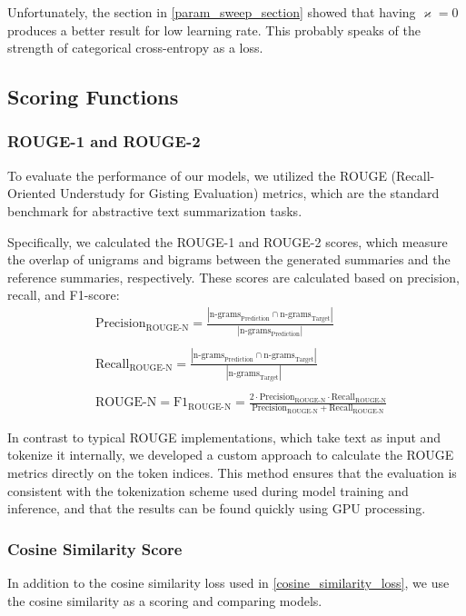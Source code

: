 Unfortunately, the section in \cref{param_sweep_section} showed that having $\varkappa = 0$ produces a better result for low learning rate.
This probably speaks of the strength of categorical cross-entropy as a loss.

\subsection{Scoring Functions}
\label{scoring_section}
\subsubsection{ROUGE-1 and ROUGE-2}
To evaluate the performance of our models, we utilized the ROUGE (Recall-Oriented Understudy for Gisting Evaluation) metrics, which are the standard benchmark for abstractive text summarization tasks\cite{abstCNN}.

Specifically, we calculated the ROUGE-1 and ROUGE-2 scores, which measure the overlap of unigrams and bigrams between the generated summaries and the reference summaries, respectively. These scores are calculated based on precision, recall, and F1-score:
\begin{equation}
    \begin{split}
        &\text{Precision}_{\text{ROUGE-N}} = \frac{|\text{n-grams}_{\text{Prediction}} \cap \text{n-grams}_{\text{Target}}|}{|\text{n-grams}_{\text{Prediction}}|}
        \\\\
        &\text{Recall}_{\text{ROUGE-N}} = \frac{|\text{n-grams}_{\text{Prediction}} \cap \text{n-grams}_{\text{Target}}|}{|\text{n-grams}_{\text{Target}}|}
        \\\\
        &\text{ROUGE-N} = \text{F1}_{\text{ROUGE-N}} = \frac{2 \cdot \text{Precision}_{\text{ROUGE-N}} \cdot \text{Recall}_{\text{ROUGE-N}}}{\text{Precision}_{\text{ROUGE-N}} + \text{Recall}_{\text{ROUGE-N}}}
    \end{split}
\end{equation}

In contrast to typical ROUGE implementations, which take text as input and tokenize it internally, we developed a custom approach to calculate the ROUGE metrics directly on the token indices.
This method ensures that the evaluation is consistent with the tokenization scheme used during model training and inference, and that the results can be found quickly using GPU processing.

\subsubsection{Cosine Similarity Score}
In addition to the cosine similarity loss used in \cref{cosine_similarity_loss}, we use the cosine similarity as a scoring and comparing models.
